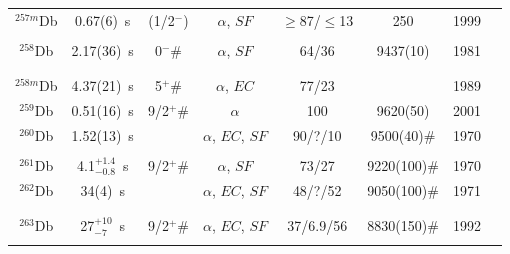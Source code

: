 \begin{center}
\begin{longtable}{c|ccccccl}
$^{257m}$Db	& 0.67(6)~s		& (1/2$^-$)	&$\alpha$, $SF$		&$\geq$87/$\leq$13& 250			&1999	&{\tiny\cite{Hessberger1999,Hessberger1999a,Hessberger2001,Hessberger2004,Gates2008a,Hessberger2009}}\\
			&				&			&					&			& 				    &		&{\tiny\cite{Hessberger2010a,ZhaoZ2024}}\\
$^{258}$Db	& 2.17(36)~s	& 0$^-$\#	&$\alpha$, $SF$		&64/36		&9437(10)		    &1981	&{\tiny\cite{Muenzenberg1981,Hessberger1982,Oganessian1984,Muenzenberg1989,Gan2001,Hessberger2009}}\\
			&				& 			&					&			&				    &		&{\tiny\cite{Hessberger2016a,Vostinar2019,Lopez-Martens2019,Yeremin2019,Mosat2020,Kuznetsova2020}}\\
			&				&			&					&			& 				    &		&{\tiny\cite{Kaleja2022,ZhaoZ2024}}\\
$^{258m}$Db	& 4.37(21)~s	& 5$^+$\# 	&$\alpha$, $EC$		&77/23		&				    &1989	&{\tiny\cite{Hessberger1985,Hessberger2009,Hessberger2016a,Vostinar2019}}\\
$^{259}$Db	& 0.51(16)~s	& 9/2$^+$\#	&$\alpha$			&100		&9620(50)			&2001	&{\tiny\cite{Gan2001,Guo2002,Hessberger2009,Folden2009,Antalic2015}}\\
$^{260}$Db	& 1.52(13)~s	& 			&$\alpha$, $EC$, $SF$&90/?/10	&9500(40)$\#$		&1970	&{\tiny\cite{Flerov1968c,Flerov1970b,Ghiorso1970a,Druin1971,Bemis1977,Hofmann1995a}}\\
			&				& 			&					&			&				    &		&{\tiny\cite{Hofmann2002,Morimoto2004,Gan2004,Morita2004a,Folden2004}}\\
$^{261}$Db	& 4.1$^{+1.4}_{-0.8}$~s& 9/2$^+$\#&$\alpha$, $SF$&73/27		&9220(100)$\#$	    &1970	&{\tiny\cite{Flerov1971,Druin1971,Ghiorso1971a,Lane1998,Gan2004,Asai2013a}}\\
$^{262}$Db	& 34(4)~s		& 			&$\alpha$, $EC$, $SF$&48/?/52		&9050(100)$\#$	&1971	&{\tiny\cite{Ghiorso1971a,Bemis1977c,Bemis1977b,Druin1979,Gregorich1988,Kratz1989}}\\
			&				&			&					&			& 				    &		&{\tiny\cite{Gober1992,Dressler1999,Wilk2000,Nagame2003,Morita2004b,Qin2006}}\\
			&				&			&					&			& 				    &		&{\tiny\cite{Morita2007,Morita2009,Morita2012,Haba2014,Haba2020}}\\
$^{263}$Db	& 27$^{+10}_{-7}$~s	&9/2$^+$\#&$\alpha$, $EC$, $SF$&37/6.9/56&8830(150)$\#$	    &1992	&{\tiny\cite{Gregorich1987,Gober1992,Kratz1992,Schaedel1992,Zimmermann1993,Gregorich1995}}\\
			&				&			&					&			& 				    &		&{\tiny\cite{Wilk2000,Kratz2003,Haba2020}}\\

\end{longtable}
\end{center}
